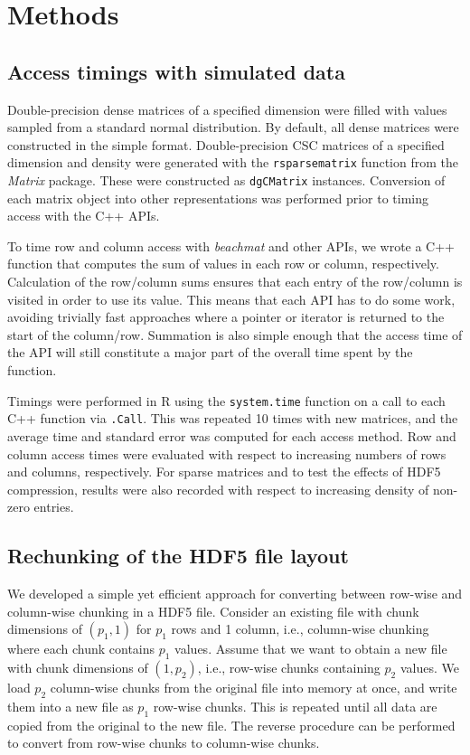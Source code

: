 \documentclass[10pt,letterpaper]{article}
\newcommand{\beachmat}{\textit{beachmat}}
\newcommand{\code}[1]{\texttt{#1}}
\begin{document}
\section*{Methods}

\subsection*{Access timings with simulated data}
Double-precision dense matrices of a specified dimension were filled with values sampled from a standard normal distribution.
By default, all dense matrices were constructed in the simple format.
Double-precision CSC matrices of a specified dimension and density were generated with the \code{rsparsematrix} function from the \textit{Matrix} package. 
These were constructed as \code{dgCMatrix} instances.
Conversion of each matrix object into other representations was performed prior to timing access with the C++ APIs.

To time row and column access with \beachmat{} and other APIs, we wrote a C++ function that computes the sum of values in each row or column, respectively.
Calculation of the row/column sums ensures that each entry of the row/column is visited in order to use its value.
This means that each API has to do some work, avoiding trivially fast approaches where a pointer or iterator is returned to the start of the column/row.
Summation is also simple enough that the access time of the API will still constitute a major part of the overall time spent by the function.

Timings were performed in R using the \code{system.time} function on a call to each C++ function via \code{.Call}. 
This was repeated 10 times with new matrices, and the average time and standard error was computed for each access method. 
Row and column access times were evaluated with respect to increasing numbers of rows and columns, respectively.
For sparse matrices and to test the effects of HDF5 compression, results were also recorded with respect to increasing density of non-zero entries.

\subsection*{Rechunking of the HDF5 file layout}
We developed a simple yet efficient approach for converting between row-wise and column-wise chunking in a HDF5 file.
Consider an existing file with chunk dimensions of $(p_1, 1)$ for $p_1$ rows and 1 column, i.e., column-wise chunking where each chunk contains $p_1$ values.
Assume that we want to obtain a new file with chunk dimensions of $(1, p_2)$, i.e., row-wise chunks containing $p_2$ values.
We load $p_2$ column-wise chunks from the original file into memory at once, and write them into a new file as $p_1$ row-wise chunks.
This is repeated until all data are copied from the original to the new file.
The reverse procedure can be performed to convert from row-wise chunks to column-wise chunks.
\end{document}
